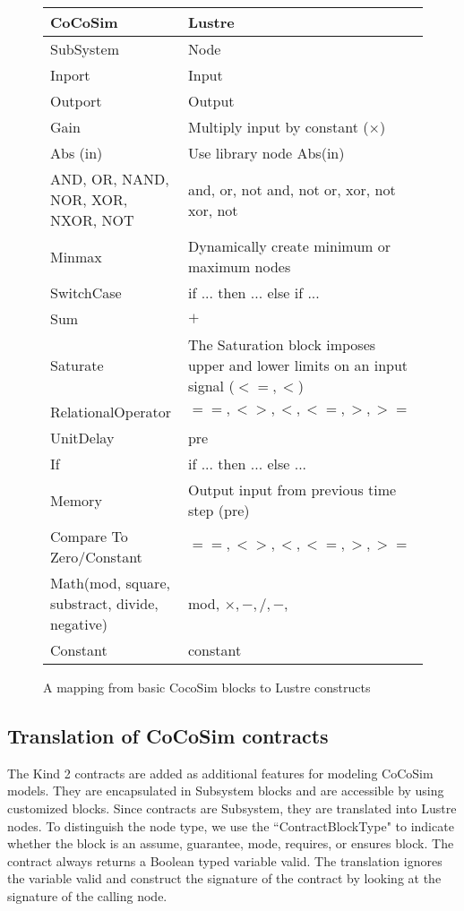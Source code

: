 \documentclass{article}
\begin{document}
\begin{figure}[t]
\centering
{
\begin{tabular}{lp{5cm}}
\hline
\textbf{CoCoSim} & \textbf{Lustre}  \\
\hline
SubSystem & 
Node
\\
Inport &
Input
\\
Outport &
Output
\\
Gain &
Multiply input by constant ($\times$)
\\

Abs (in) &
Use library node Abs(in)
\\

AND, OR, NAND, NOR, XOR, NXOR, NOT
&
and, or, not and, not or, xor, not xor, not
\\

Minmax &
{Dynamically create minimum or maximum nodes}
\\

SwitchCase &
{if ... then ... else if ... }
\\

Sum &
$+$
\\

Saturate &
The Saturation block imposes upper and lower limits on an input signal ($<=, <$)
\\

RelationalOperator &
$==, <>, <, <=, >, >=$
\\

UnitDelay &
pre
\\

If &
if ... then ... else ...
\\

Memory &
Output input from previous time step (pre)
\\

Compare To Zero/Constant  &
$==, <>, <, <=, >, >=$
\\

Math(mod, square, substract, divide, negative) &
mod, $\times, -, /, - $, 
\\

Constant &
constant
\\

\hline
\end{tabular}
}
\caption{A mapping from basic CocoSim blocks to Lustre constructs}
\label{basicmapping}
\end{figure}


\subsection{Translation of CoCoSim contracts}
The Kind 2 contracts are added as additional features for modeling CoCoSim models.
They are encapsulated in Subsystem blocks and are accessible by using customized 
blocks.
Since contracts are Subsystem, they are translated into Lustre nodes. 
To distinguish the node type, we use the ``ContractBlockType" to indicate whether the block 
is an \textsf{assume}, \textsf{guarantee}, \textsf{mode}, \textsf{requires}, or \textsf{ensures} block.
The contract always returns a Boolean typed variable valid.
The translation ignores the variable valid and construct the signature 
of the contract by looking at the signature of the calling node.
\end{document}
